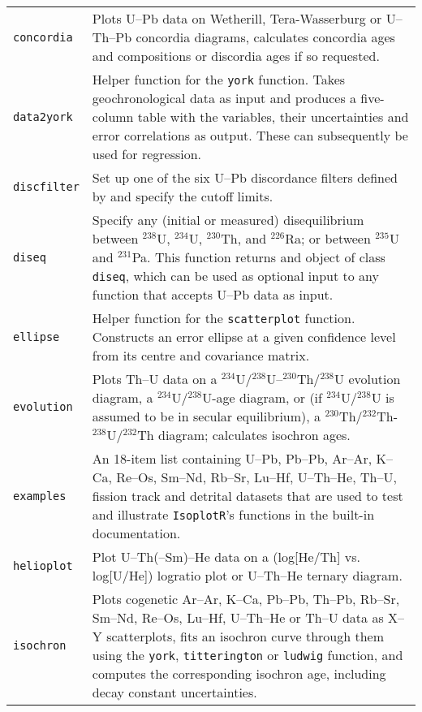 \begin{refsection}
\begin{longtable}{@{}p{.2\linewidth}@{}p{.8\linewidth}@{}}
\texttt{concordia} & Plots U--Pb data on Wetherill, Tera-Wasserburg or
U--Th--Pb concordia diagrams, calculates concordia ages and
compositions or discordia ages if so requested.\\

\texttt{data2york} & Helper function for the \texttt{york}
function. Takes geochronological data as input and produces a
five-column table with the variables, their uncertainties and error
correlations as output. These can subsequently be used for
\citet{york2004} regression.\\

\texttt{discfilter} & Set up one of the six U--Pb discordance filters
defined by \citet{vermeesch2021} and specify the cutoff limits.\\

\texttt{diseq} & Specify any (initial or measured) disequilibrium
between $^{238}$U, $^{234}$U, $^{230}$Th, and $^{226}$Ra; or between
$^{235}$U and $^{231}$Pa. This function returns and object of class
\texttt{diseq}, which can be used as optional input to any function
that accepts U--Pb data as input.\\

\texttt{ellipse} & Helper function for the \texttt{scatterplot}
function. Constructs an error ellipse at a given confidence level from
its centre and covariance matrix. \\

\texttt{evolution} & Plots Th--U data on a
$^{234}$U/$^{238}$U--$^{230}$Th/$^{238}$U evolution diagram, a
$^{234}$U/$^{238}$U-age diagram, or (if $^{234}$U/$^{238}$U is assumed
to be in secular equilibrium), a
$^{230}$Th/$^{232}$Th-$^{238}$U/$^{232}$Th diagram; calculates
isochron ages.\\

\texttt{examples} & An 18-item list containing U--Pb, Pb--Pb, Ar--Ar,
K--Ca, Re--Os, Sm--Nd, Rb--Sr, Lu--Hf, U--Th--He, Th--U, fission track
and detrital datasets that are used to test and illustrate
\texttt{IsoplotR}'s functions in the built-in documentation.\\

\texttt{helioplot} & Plot U--Th(--Sm)--He data on a (log[He/Th]
vs. log[U/He]) logratio plot or U--Th--He ternary diagram.\\

\texttt{isochron} & Plots cogenetic Ar--Ar, K--Ca, Pb--Pb, Th--Pb,
Rb--Sr, Sm--Nd, Re--Os, Lu--Hf, U--Th--He or Th--U data as X--Y
scatterplots, fits an isochron curve through them using the
\texttt{york}, \texttt{titterington} or \texttt{ludwig} function, and
computes the corresponding isochron age, including decay constant
uncertainties.\\


\end{longtable}
\end{refsection}
